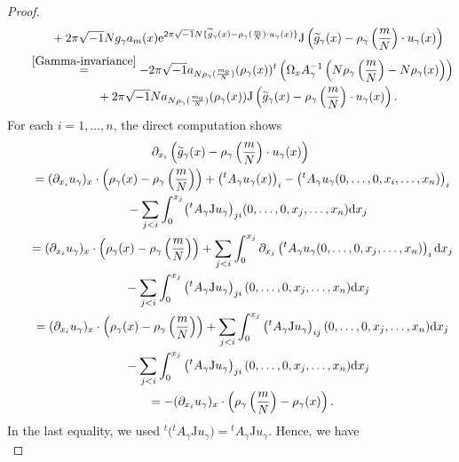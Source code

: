 \documentclass[10pt,a4paper]{amsart}
\numberwithin{equation}{section}
\renewcommand{\tilde}{\widetilde}
\def\J{\mathrm{J}}
\begin{document}
\begin{proof}
\begin{gather}
\phantom{\qquad=}{}+2\pi\sqrt{-1}Ng_\gamma a_m(x){\rm e}^{2\pi\sqrt{-1}N\{ {\tilde g}_\gamma(x)-\rho_\gamma(\frac{m}{N})\cdot u_\gamma (x)\}} \J \left( {\tilde g}_\gamma(x)-\rho_\gamma\left(\frac{m}{N}\right)\cdot u_\gamma (x)\right) \nonumber \\
\qquad\stackrel{\eqref{Gamma-invariance}}{=}-2\pi\sqrt{-1}a_{N\rho_\gamma (\frac{m_0}{N})}(\rho_\gamma(x)){}^t\left(\Omega_xA_\gamma^{-1}\left(N\rho_\gamma \left(\frac{m}{N}\right)-N\rho_\gamma (x)\right)\right)\nonumber \\
\phantom{\qquad=}{}+2\pi\sqrt{-1}Na_{N\rho_\gamma (\frac{m_0}{N})}(\rho_\gamma(x))\J \left( {\tilde g}_\gamma(x)-\rho_\gamma\left(\frac{m}{N}\right)\cdot u_\gamma (x)\right) .\label{RHS}
\end{gather}
For each $i=1,\ldots ,n$, the direct computation shows
\begin{gather*}
\partial_{x_i}\left( {\tilde g}_\gamma(x)-\rho_\gamma\left(\frac{m}{N}\right)\cdot u_\gamma (x)\right)\\
\qquad=(\partial_{x_i}u_\gamma)_x\cdot \left(\rho_\gamma (x)-\rho_\gamma \left(\frac{m}{N}\right)\right)+\left({}^tA_\gamma u_\gamma(x)\right)_i-\left({}^tA_\gamma u_\gamma(0,\ldots ,0,x_i,\ldots ,x_n)\right)_i\\
\phantom{\qquad=}{} -\sum_{j<i}\int_0^{x_j}\bigl({}^tA_\gamma \J u_\gamma\bigr)_{ji}(0,\ldots ,0,x_j,\ldots ,x_n){\rm d}x_j \\
\qquad=(\partial_{x_i}u_\gamma)_x\cdot \left(\rho_\gamma (x)-\rho_\gamma \left(\frac{m}{N}\right)\right)
+\sum_{j<i}\int_0^{x_j}\partial_{x_j}\left({}^tA_\gamma u_\gamma (0,\ldots ,0,x_j,\ldots ,x_n)\right)_i{\rm d}x_j \\
\phantom{\qquad=}{} -\sum_{j<i}\int_0^{x_j}\left({}^tA_\gamma \J u_\gamma\right)_{ji}(0,\ldots ,0,x_j,\ldots ,x_n){\rm d}x_j \\
\qquad=(\partial_{x_i}u_\gamma)_x\cdot \left(\rho_\gamma (x)-\rho_\gamma \left(\frac{m}{N}\right)\right)
+\sum_{j<i}\int_0^{x_j}\left({}^tA_\gamma \J u_\gamma \right)_{ij}(0,\ldots ,0,x_j,\ldots ,x_n){\rm d}x_j\\
\phantom{\qquad=}{} -\sum_{j<i}\int_0^{x_j}\left({}^tA_\gamma \J u_\gamma\right)_{ji}(0,\ldots ,0,x_j,\ldots ,x_n){\rm d}x_j \\
\qquad=-(\partial_{x_i}u_\gamma)_x\cdot \left(\rho_\gamma \left(\frac{m}{N}\right)-\rho_\gamma (x)\right) .
\end{gather*}
In the last equality, we used ${}^t\bigl({}^tA_\gamma \J u_\gamma\bigr)={}^tA_\gamma \J u_\gamma$. Hence, we have
\begin{equation}\label{RHS2}

\end{equation}
\end{proof}
\end{document}
